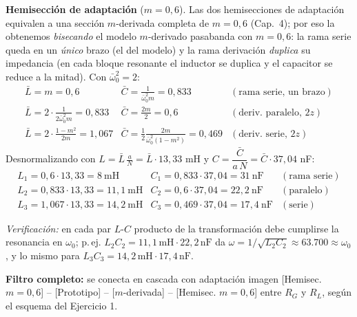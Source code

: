 \documentclass[class=article, crop=false, oneside]{standalone}
\begin{document}
\noindent\textbf{Hemisección de adaptación} ($m = 0{,}6$). Las dos hemisecciones de
adaptación equivalen a una sección $m$-derivada completa de $m=0{,}6$ (Cap.~4); por
eso la obtenemos \emph{bisecando} el modelo $m$-derivado pasabanda con $m=0{,}6$: la
rama serie queda en un \emph{único} brazo (el del modelo) y la rama derivación
\emph{duplica} su impedancia (en cada bloque resonante el inductor se duplica y el
capacitor se reduce a la mitad). Con $\bar\omega_0^2=2$:
\[
    \begin{array}{lll}
        \bar L=m=0{,}6 & \bar C=\tfrac{1}{\bar\omega_0^2 m}=0{,}833 & (\text{rama serie, un brazo})\\[3pt]
        \bar L=2\cdot\tfrac{1}{2\bar\omega_0^2 m}=0{,}833 & \bar C=\tfrac{2m}{2}=0{,}6 & (\text{deriv.\ paralelo, }2z)\\[3pt]
        \bar L=2\cdot\tfrac{1-m^2}{2m}=1{,}067 & \bar C=\tfrac{1}{2}\tfrac{2m}{\bar\omega_0^2(1-m^2)}=0{,}469 & (\text{deriv.\ serie, }2z)
    \end{array}
\]
Desnormalizando con $L=\bar L\,\tfrac{a}{N}=\bar L\cdot 13{,}33$ mH y $C=\dfrac{\bar C}{a\,N}=\bar C\cdot 37{,}04$ nF:
\[
    \begin{array}{lll}
        L_1 = 0{,}6\cdot 13{,}33 = 8\ \text{mH} & C_1 = 0{,}833\cdot 37{,}04 = 31\ \text{nF} & (\text{rama serie})\\[3pt]
        L_2 = 0{,}833\cdot 13{,}33 = 11{,}1\ \text{mH} & C_2 = 0{,}6\cdot 37{,}04 = 22{,}2\ \text{nF} & (\text{paralelo})\\[3pt]
        L_3 = 1{,}067\cdot 13{,}33 = 14{,}2\ \text{mH} & C_3 = 0{,}469\cdot 37{,}04 = 17{,}4\ \text{nF} & (\text{serie})
    \end{array}
\]

\begin{figure}[H]
    \centering
    
\end{figure}

\begin{nota}
\textit{Verificación:} en cada par $L$-$C$ producto de la transformación debe
cumplirse la resonancia en $\omega_0$; p.\,ej. $L_2 C_2 = 11{,}1\,\text{mH}\cdot 22{,}2\,\text{nF}$
da $\omega = 1/\sqrt{L_2 C_2} \approx 63.700 \approx \omega_0$, y lo mismo para
$L_3 C_3 = 14{,}2\,\text{mH}\cdot 17{,}4\,\text{nF}$.
\end{nota}

\noindent\textbf{Filtro completo:} se conecta en cascada con adaptación imagen
\;\textsf{[Hemisec. $m{=}0{,}6$] -- [Prototipo] -- [$m$-derivada] -- [Hemisec. $m{=}0{,}6$]}\;
entre $R_G$ y $R_L$, según el esquema del Ejercicio 1.
\end{document}
